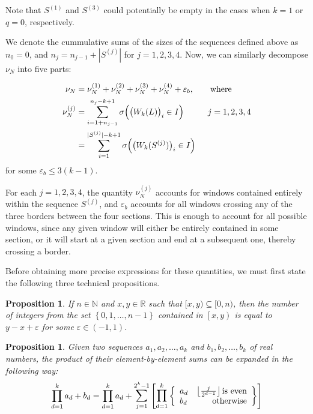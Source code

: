 \documentclass[11pt,a4paper]{tesis}
\theoremstyle{plain}
\newtheorem{proposition}[theorem]{Proposition}
\theoremstyle{definition}
\begin{document}
Note that $S^{(1)}$ and $S^{(3)}$ could potentially be empty in the cases when $k = 1$ or $q = 0$, respectively.

We denote the cummulative sums of the sizes of the sequences defined above as $n_0 = 0$, and $n_j = n_{j - 1} + |S^{(j)}|$ for $j = 1, 2, 3, 4$. Now, we can similarly decompose $\nu_N$ into five parts:

\begin{equation}\label{equation:nu-n-split-five-parts}
  \begin{aligned}
    \nu_N & = \nu^{(1)}_N + \nu^{(2)}_N + \nu^{(3)}_N + \nu^{(4)}_N + \varepsilon_b \text{, \hspace*{5mm} where} \\
    \nu^{(j)}_N & = \sum_{i = 1 + n_{j - 1}}^{n_j - k + 1} \sigma\Big( \big( W_k(L) \big)_i \in I \Big) \text{\hspace*{10mm}} j = 1, 2, 3, 4 \\
                & = \sum_{i = 1}^{|S^{(j)}| - k + 1} \sigma\Big( \big( W_k(S^{(j)}) \big)_i \in I \Big)
  \end{aligned}
\end{equation}
for some $\varepsilon_b \le 3 (k - 1)$.

For each $j = 1, 2, 3, 4$, the quantity $\nu^{(j)}_N$ accounts for windows contained entirely within the sequence $S^{(j)}$, and $\varepsilon_b$ accounts for all windows crossing any of the three borders between the four sections. This is enough to account for all possible windows, since any given window will either be entirely contained in some section, or it will start at a given section and end at a subsequent one, thereby crossing a border.

Before obtaining more precise expressions for these quantities, we must first state the following three technical propositions.

\begin{proposition}\label{proposition:inequality-sandwich}
  If $n \in \mathbb{N}$ and $x, y \in \mathbb{R}$ such that $[x, y) \subseteq [0, n)$, then the number of integers from the set $\left \{ 0, 1, \dots, n - 1 \right \}$ contained in $\left[x, y\right)$ is equal to $y - x + \varepsilon$ for some $\varepsilon \in (-1, 1)$.
\end{proposition}

\begin{proposition}\label{proposition:product-of-sums}
  Given two sequences $a_1, a_2, \dots, a_k$ and $b_1, b_2, \dots, b_k$ of real numbers, the product of their element-by-element sums can be expanded in the following way:
  \begin{equation*}
    \prod_{d = 1}^{k} a_d + b_d = \prod_{d = 1}^{k} a_d + \mathlarger{\sum}_{j = 1}^{2^k - 1} \left [ \mathlarger{\prod}_{d = 1}^{k}
      \left \{ \begin{array}{lr}
        a_d & \left\lfloor \frac{j}{2^{d - 1}} \right\rfloor \text{is even} \\
        b_d & \text{otherwise}
      \end{array} \right \} \right ]
  \end{equation*}
\end{proposition}
\end{document}
